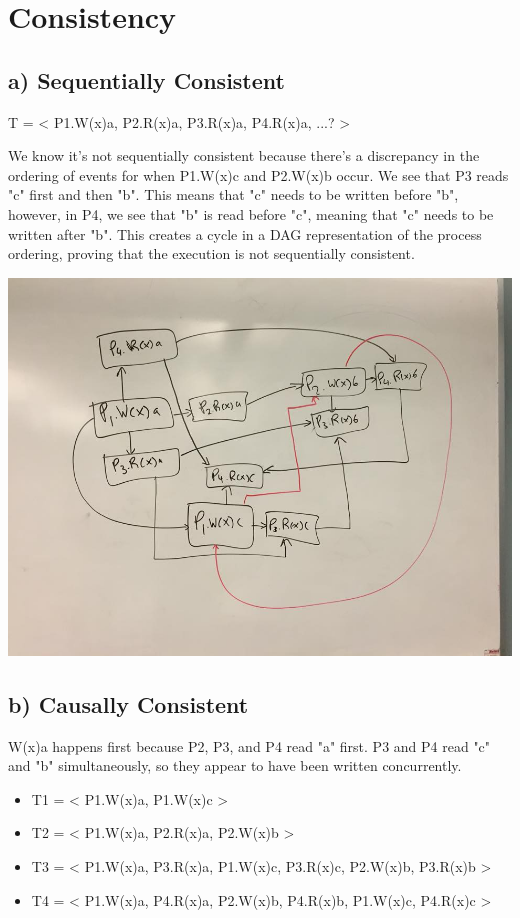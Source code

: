 \documentclass[12pt]{article}
\begin{document}
\section{Consistency}
\subsection*{a) Sequentially Consistent}
T = < P1.W(x)a, P2.R(x)a, P3.R(x)a, P4.R(x)a, ...? >

We know it's not sequentially consistent because there's a discrepancy in the ordering of events for when  P1.W(x)c and P2.W(x)b occur. We see that P3 reads "c" first and then "b". This means that "c" needs to be written before "b", however, in P4, we see that "b" is read before "c", meaning that "c" needs to be written after "b". This creates a cycle in a DAG representation of the process ordering, proving that the execution is not sequentially consistent.

\begin{center}
\includegraphics[scale=0.25]{sequential0}
\end{center}
\subsection*{b) Causally Consistent}
W(x)a happens first because P2, P3, and P4 read "a" first. P3 and P4 read "c" and "b" simultaneously, so they appear to have been written concurrently.

\begin{itemize}
\item T1 = < P1.W(x)a, P1.W(x)c >
\item T2 = < P1.W(x)a, P2.R(x)a, P2.W(x)b >
\item T3 = < P1.W(x)a, P3.R(x)a, P1.W(x)c, P3.R(x)c, P2.W(x)b, P3.R(x)b >
\item T4 = < P1.W(x)a, P4.R(x)a, P2.W(x)b, P4.R(x)b, P1.W(x)c, P4.R(x)c >
\end{itemize}
\end{document}
